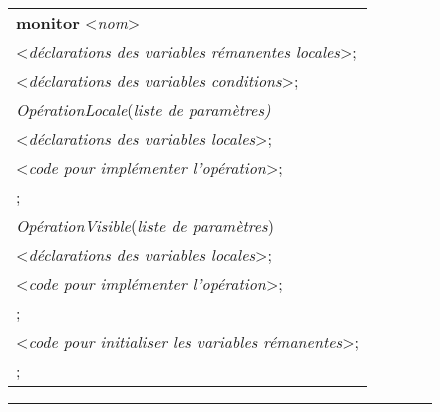 \begin{figure}[!ht]
\begin{center}
\begin{tabular}{l}
{\bf monitor} <{\em nom}> \\
\hspace{0.3cm}<{\em déclarations des variables rémanentes locales}>; \\
\hspace{0.3cm}<{\em déclarations des variables conditions}>;  \\
\hspace{0.3cm}{\bf procedure} {\em OpérationLocale}({\em liste de paramètres)}  \\
\hspace{0.6cm}<{\em déclarations des variables locales}>; \\
\hspace{0.6cm}{\bf begin} <{\em code pour implémenter l'opération}>; \\
\hspace{0.6cm}{\bf end}; \\
\hspace{0.3cm}{\bf entry procedure} {\em OpérationVisible}({\em liste de paramètres}) \\
\hspace{0.6cm}<{\em déclarations des variables locales}>; \\
\hspace{0.6cm}{\bf begin} <{\em code pour implémenter l'opération}>; \\
\hspace{0.6cm}{\bf end}; \\
\hspace{0.3cm}{\bf begin} <{\em code pour initialiser les variables rémanentes}>; \\
\hspace{0.3cm}{\bf end};
\end{tabular}
\end{center}
\vspace{-.2cm}
\rule{\textwidth}{0.01in}
\end{figure}

